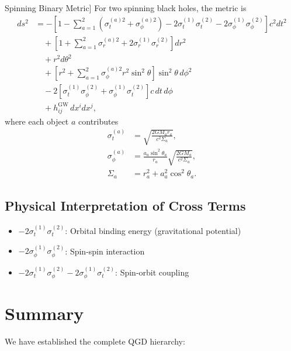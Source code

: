 \documentclass[11pt,a4paper]{article}
\theoremstyle{definition}
\theoremstyle{remark}
\begin{document}
	Spinning Binary Metric]
		For two spinning black holes, the metric is
		\begin{equation}
			\boxed{
				\begin{aligned}
					ds^2 &= -\left[1 - \sum_{a=1}^2 \left(\sigma_t^{(a)2} + \sigma_\phi^{(a)2}\right) - 2\sigma_t^{(1)}\sigma_t^{(2)} - 2\sigma_\phi^{(1)}\sigma_\phi^{(2)}\right] c^2 dt^2\\
					&\quad + \left[1 + \sum_{a=1}^2 \sigma_r^{(a)2} + 2\sigma_r^{(1)}\sigma_r^{(2)}\right] dr^2\\
					&\quad + r^2 d\theta^2\\
					&\quad + \left[r^2 + \sum_{a=1}^2 \sigma_\phi^{(a)2} r^2\sin^2\theta\right] \sin^2\theta \, d\phi^2\\
					&\quad - 2\left[\sigma_t^{(1)}\sigma_\phi^{(2)} + \sigma_\phi^{(1)}\sigma_t^{(2)}\right] c \, dt \, d\phi\\
					&\quad + h_{ij}^{\text{GW}} \, dx^i dx^j,
				\end{aligned}
			}
		\end{equation}
		where each object $a$ contributes
		\begin{align}
			\sigma_t^{(a)} &= \sqrt{\frac{2GM_a r_a}{c^2\Sigma_a}},\\
			\sigma_\phi^{(a)} &= \frac{a_a \sin^2\theta_a}{r_a} \sqrt{\frac{2GM_a}{c^2\Sigma_a}},\\
			\Sigma_a &= r_a^2 + a_a^2 \cos^2\theta_a.
		\end{align}
	
	\subsection{Physical Interpretation of Cross Terms}
	
	\begin{itemize}
		\item $-2\sigma_t^{(1)}\sigma_t^{(2)}$: Orbital binding energy (gravitational potential)
		\item $-2\sigma_\phi^{(1)}\sigma_\phi^{(2)}$: Spin-spin interaction
		\item $-2\sigma_t^{(1)}\sigma_\phi^{(2)} - 2\sigma_\phi^{(1)}\sigma_t^{(2)}$: Spin-orbit coupling
	\end{itemize}
	
	\section{Summary}
	
	We have established the complete QGD hierarchy:
	
\end{document}
